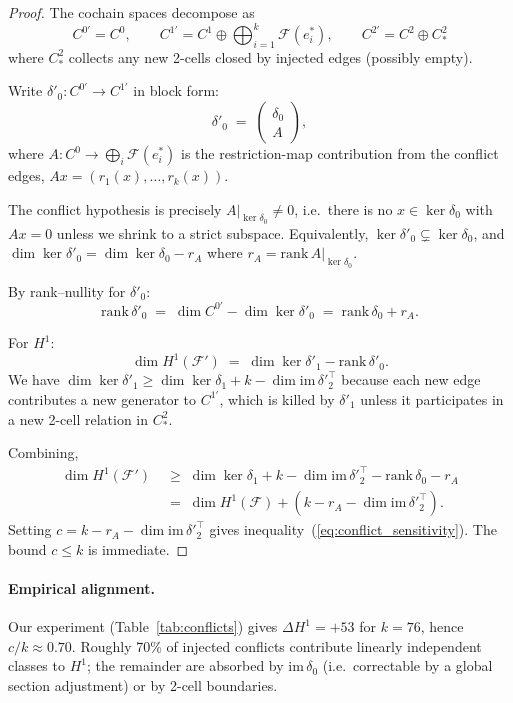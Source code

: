 \begin{proof}
The cochain spaces decompose as
\[
C^{0\prime} = C^0, \qquad
C^{1\prime} = C^1 \oplus \bigoplus_{i=1}^{k} \mathcal{F}(e^*_i), \qquad
C^{2\prime} = C^2 \oplus C^2_*
\]
where $C^2_*$ collects any new 2-cells closed by injected edges
(possibly empty).

Write $\delta'_0: C^{0\prime} \to C^{1\prime}$ in block form:
\[
\delta'_0 \;=\; \begin{pmatrix} \delta_0 \\ A \end{pmatrix},
\]
where $A: C^0 \to \bigoplus_i \mathcal{F}(e^*_i)$ is the restriction-map
contribution from the conflict edges, $A x = (r_1(x), \ldots, r_k(x))$.

The conflict hypothesis is precisely $A|_{\ker \delta_0} \neq 0$, i.e.\ there
is no $x \in \ker \delta_0$ with $A x = 0$ unless we shrink to a strict
subspace. Equivalently, $\ker \delta'_0 \subsetneq \ker \delta_0$, and
$\dim \ker \delta'_0 = \dim \ker \delta_0 - r_A$ where
$r_A = \mathrm{rank}\, A|_{\ker \delta_0}$.

By rank--nullity for $\delta'_0$:
\[
\mathrm{rank}\, \delta'_0 \;=\; \dim C^{0\prime} - \dim \ker \delta'_0
\;=\; \mathrm{rank}\, \delta_0 + r_A.
\]

For $H^1$:
\[
\dim H^1(\mathcal{F}') \;=\; \dim \ker \delta'_1 - \mathrm{rank}\, \delta'_0.
\]
We have $\dim \ker \delta'_1 \geq \dim \ker \delta_1 + k - \dim
\mathrm{im}\, \delta'^\top_2$ because each new edge contributes a new
generator to $C^{1\prime}$, which is killed by $\delta'_1$ unless it
participates in a new 2-cell relation in $C^2_*$.

Combining,
\begin{align*}
\dim H^1(\mathcal{F}') &\;\geq\; \dim \ker \delta_1 + k - \dim
\mathrm{im}\, \delta'^\top_2 - \mathrm{rank}\, \delta_0 - r_A \\
&\;=\; \dim H^1(\mathcal{F}) + (k - r_A - \dim \mathrm{im}\, \delta'^\top_2).
\end{align*}
Setting $c = k - r_A - \dim \mathrm{im}\, \delta'^\top_2$ gives
inequality~(\ref{eq:conflict_sensitivity}). The bound $c \leq k$ is
immediate.
\end{proof}

\paragraph{Empirical alignment.} Our experiment (Table~\ref{tab:conflicts})
gives $\Delta H^1 = +53$ for $k = 76$, hence $c/k \approx 0.70$. Roughly 70\%
of injected conflicts contribute linearly independent classes to $H^1$;
the remainder are absorbed by $\mathrm{im}\,\delta_0$ (i.e.\ correctable by
a global section adjustment) or by 2-cell boundaries.

